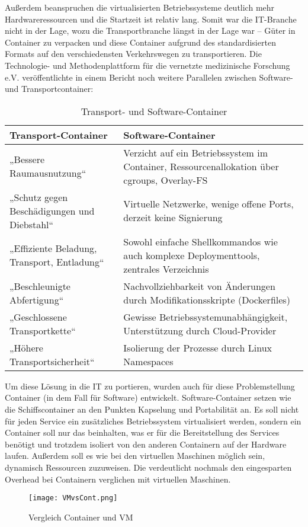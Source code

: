 Außerdem beanspruchen die virtualisierten Betriebssysteme deutlich mehr Hardwareressourcen und die Startzeit ist relativ lang.
Somit war die IT-Branche nicht in der Lage, wozu die Transportbranche längst in der Lage war -- Güter in Container zu verpacken und diese Container aufgrund des standardisierten Formats auf den verschiedensten Verkehrswegen zu transportieren. Die Technologie- und Methodenplattform für die vernetzte medizinische Forschung e.V. veröffentlichte in einem Bericht \citep{TUM} noch weitere Parallelen zwischen Software- und Transportcontainer:
\begin{table}[h]
\def\arraystretch{1.5}%
\begin{tabular}{|p{}|p{}|}\hline
	\textbf{Transport-Container} & \textbf{Software-Container} \\ \hline
	„Bessere Raumausnutzung“ & Verzicht auf ein Betriebssystem im Container, Ressourcenallokation über cgroups, Overlay-FS \\ \hline
	„Schutz gegen Beschädigungen und Diebstahl“ & Virtuelle Netzwerke, wenige offene Ports, derzeit keine Signierung \\ \hline
	„Effiziente Beladung, Transport, Entladung“ & Sowohl einfache Shellkommandos wie auch komplexe Deploymenttools, zentrales Verzeichnis \\ \hline
	„Beschleunigte Abfertigung“ & Nachvollziehbarkeit von Änderungen durch Modifikationsskripte (Dockerfiles) \\ \hline
	„Geschlossene Transportkette“ &Gewisse Betriebssystemunabhängigkeit, Unterstützung durch Cloud-Provider \\ \hline
	„Höhere Transportsicherheit“ & Isolierung der Prozesse durch Linux Namespaces \\ \hline
\end{tabular}
\caption{Transport- und Software-Container}
\end{table}

Um diese Lösung in die IT zu portieren, wurden auch für diese Problemstellung Container (in dem Fall für Software) entwickelt.
Software-Container setzen wie die Schiffscontainer an den Punkten Kapselung und Portabilität an.
Es soll nicht für jeden Service ein zusätzliches Betriebssystem virtualisiert werden, sondern ein Container soll nur das beinhalten, was er für die Bereitstellung des Services benötigt und trotzdem isoliert von den anderen Containern auf der Hardware laufen.
Außerdem soll es wie bei den virtuellen Maschinen möglich sein, dynamisch Ressourcen zuzuweisen. \citep{12005068320161201, redhat}
Die  verdeutlicht nochmals den eingesparten Overhead bei Containern verglichen mit virtuellen Maschinen.
\begin{figure}[H]
	\begin{center}
		\texttt{[image: VMvsCont.png]}
	\end{center}
	\caption[Vergleich Container und VM]{Vergleich Container und VM}
	\label{fig:VergleichContainerVM}
\end{figure}
\newpage


